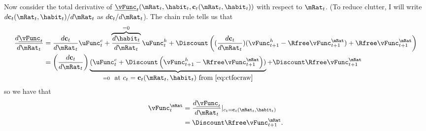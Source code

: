 Now consider the total derivative of $\underline{\vFunc}_{t}(\mRat_{t},\habit_{t},\mathbf{c}_{t}(\mRat_{t},\habit_{t}))$ with respect to $\mRat_{t}$.
(To reduce clutter, I will write $d \mathbf{c}_{t}(\mRat_{t},\habit_{t})/d \mRat_{t}$ as $d \mathbf{c}_{t}/d \mRat_{t}$).
The chain rule tells us that
\begin{equation}\begin{gathered}\begin{aligned}
        \frac{d \underline{\vFunc}_{t}}{d \mRat_{t}} & =  \frac{d \mathbf{c}_{t}}{d \mRat_{t}}\uFunc^{c}_{t}+\overbrace{\frac{d \habit_{t}}{d \mRat_{t}}}^{=0} \uFunc^{h}_{t}
         + \Discount \left((\frac{d \mathbf{c}_{t}}{d \mRat_{t}})(\vFunc^{h}_{t+1}-\Rfree \vFunc_{t+1}^{\mRat}) + \Rfree \vFunc_{t+1}^{\mRat} \right)
\\ & =  \left(\frac{d \mathbf{c}_{t}}{d \mRat_{t}}\right)
\underbrace{(\uFunc_{t}^{c}+\Discount\left(\vFunc_{t+1}^{h}-\Rfree \vFunc_{t+1}^{\mRat}\right))}_{=0~\mbox{ at $c_{t}=\mathbf{c}_{t}(\mRat_{t},\habit_{t})$ from \eqref{eq:ctfocraw}}}+\Discount \Rfree \vFunc_{t+1}^{\mRat}
\end{aligned}\end{gathered}\end{equation}
so we have that
\begin{equation}\begin{gathered}\begin{aligned}
        \vFunc_{t}^{\mRat} & =  \frac{d \underline{\vFunc}_{t}}{d \mRat_{t}}|_{c_{t}=\mathbf{c}_{t}(\mRat_{t},\habit_{t})}  \\
         & =  \Discount \Rfree \vFunc^{\mRat}_{t+1}.
\end{aligned}\end{gathered}\end{equation}

